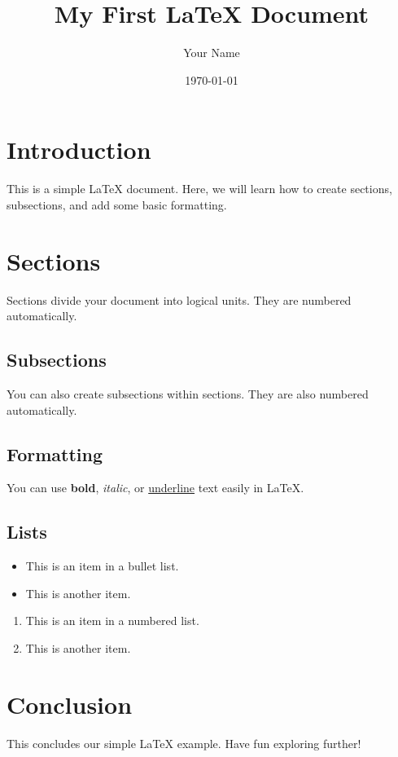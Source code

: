 \documentclass{article}
\title{My First LaTeX Document}
\author{Your Name}
\date{\today}
\begin{document}
\maketitle

\section{Introduction}
This is a simple LaTeX document. Here, we will learn how to create sections, subsections, and add some basic formatting.

\section{Sections}
Sections divide your document into logical units. They are numbered automatically.

\subsection{Subsections}
You can also create subsections within sections. They are also numbered automatically.

\subsection{Formatting}
You can use \textbf{bold}, \textit{italic}, or \underline{underline} text easily in LaTeX.

\subsection{Lists}
\begin{itemize}
    \item This is an item in a bullet list.
    \item This is another item.
\end{itemize}

\begin{enumerate}
    \item This is an item in a numbered list.
    \item This is another item.
\end{enumerate}

\section{Conclusion}
This concludes our simple LaTeX example. Have fun exploring further!
\end{document}

